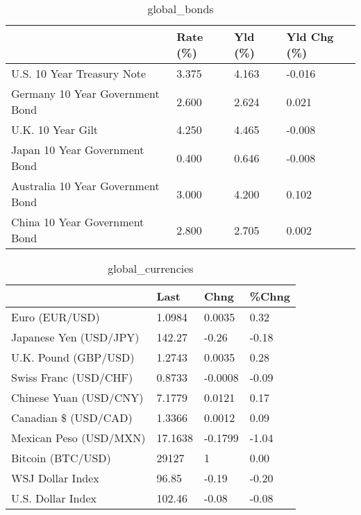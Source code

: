 \documentclass{article}%
\begin{document}
%


\begin{table}[htbp]%
\caption{global\_bonds}%
\centering%
\begin{adjustbox}{width=1\textwidth}%
\begin{tabular}{llll}
\toprule
                                  & Rate (\%) & Yld (\%) & Yld Chg (\%) \\
\midrule
       U.S. 10 Year Treasury Note &    3.375 &   4.163 &      -0.016 \\
  Germany 10 Year Government Bond &    2.600 &   2.624 &       0.021 \\
                U.K. 10 Year Gilt &    4.250 &   4.465 &      -0.008 \\
    Japan 10 Year Government Bond &    0.400 &   0.646 &      -0.008 \\
Australia 10 Year Government Bond &    3.000 &   4.200 &       0.102 \\
    China 10 Year Government Bond &    2.800 &   2.705 &       0.002 \\
\bottomrule
\end{tabular}
%
\end{adjustbox}%
\end{table}

%


\begin{table}[htbp]%
\caption{global\_currencies}%
\centering%
\begin{adjustbox}{width=1\textwidth}%
\begin{tabular}{llll}
\toprule
                       &    Last &    Chng & \%Chng \\
\midrule
        Euro (EUR/USD) &  1.0984 &  0.0035 &  0.32 \\
Japanese Yen (USD/JPY) &  142.27 &   -0.26 & -0.18 \\
  U.K. Pound (GBP/USD) &  1.2743 &  0.0035 &  0.28 \\
 Swiss Franc (USD/CHF) &  0.8733 & -0.0008 & -0.09 \\
Chinese Yuan (USD/CNY) &  7.1779 &  0.0121 &  0.17 \\
  Canadian \$ (USD/CAD) &  1.3366 &  0.0012 &  0.09 \\
Mexican Peso (USD/MXN) & 17.1638 & -0.1799 & -1.04 \\
     Bitcoin (BTC/USD) &   29127 &       1 &  0.00 \\
      WSJ Dollar Index &   96.85 &   -0.19 & -0.20 \\
     U.S. Dollar Index &  102.46 &   -0.08 & -0.08 \\
\bottomrule
\end{tabular}
%
\end{adjustbox}%
\end{table}
\end{document}
